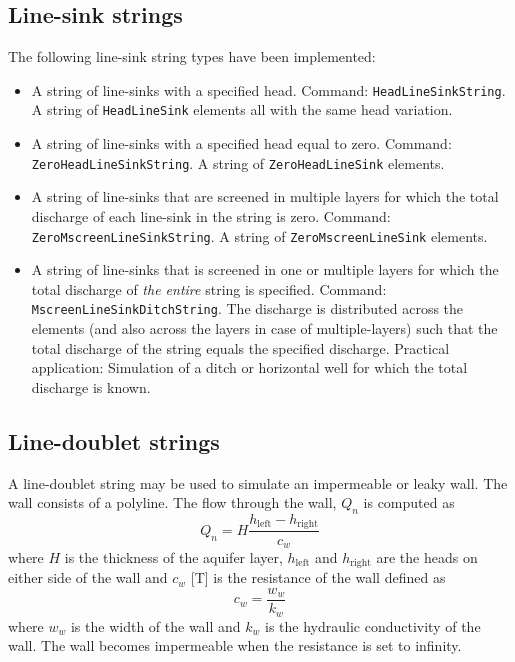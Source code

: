 \documentclass [10pt,letterpaper] {article}
\begin{document}
\subsection{Line-sink strings}
The following line-sink string types have been implemented:
\begin{itemize}
\item 
A string of line-sinks with a specified head. Command: {\tt HeadLineSinkString}. A string of {\tt HeadLineSink} elements all with the same head variation.
\item 
A string of line-sinks with a specified head equal to zero. Command: {\tt ZeroHeadLineSinkString}. A string of {\tt ZeroHeadLineSink} elements.
\item A string of  line-sinks that are screened in multiple layers for which the total discharge of each line-sink in the string is zero. Command:  {\tt ZeroMscreenLineSinkString}.  A string of {\tt ZeroMscreenLineSink} elements. 
\item A string of  line-sinks that is screened in one or multiple layers for which the total discharge of \emph{the entire} string is specified. Command: {\tt MscreenLineSinkDitchString}. The discharge is distributed across the elements (and also across the layers in case of multiple-layers) such that the total discharge of the string equals the specified discharge. Practical application: Simulation of a ditch or horizontal well for which the total discharge is known.
\end{itemize}

\subsection{Line-doublet strings}
A line-doublet string may be used to simulate an impermeable or leaky wall. The wall consists of a polyline. The flow through the wall, $Q_n$ is computed as
\begin{equation} \label{Qnleakywall}
Q_n = H\frac{h_\text{left}-h_\text{right}}{c_w}
\end{equation}
where $H$ is the thickness of the aquifer layer, $h_\text{left}$ and $h_\text{right}$ are the heads on either side of the wall and $c_w$ [T] is the resistance of the wall defined as 
\begin{equation}
c_w=\frac{w_w}{k_w}
\end{equation}
where $w_w$ is the width of the wall and $k_w$ is the hydraulic conductivity of the wall. The wall becomes impermeable when the resistance is set to infinity.
\end{document}

